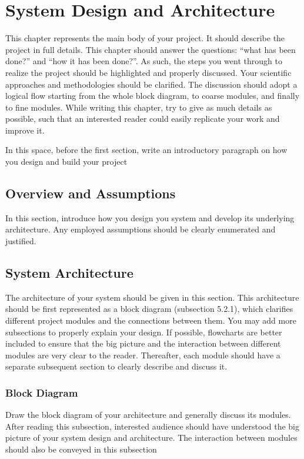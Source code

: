 \chapter{System Design and Architecture}

This chapter represents the main body of your project. It should describe the project in full details. This chapter should answer the questions: “what has been done?” and “how it has been done?”. As such, the steps you went through to realize the project should be highlighted and properly discussed. Your scientific approaches and methodologies should be clarified. The discussion should adopt a logical flow starting from the whole block diagram, to coarse modules, and finally to fine modules. While writing this chapter, try to give as much details as possible, such that an interested reader could easily replicate your work and improve it.

In this space, before the first section, write an introductory paragraph on how you design and build your project

\section{Overview and Assumptions}
In this section, introduce how you design you system and develop its underlying architecture. Any employed assumptions should be clearly enumerated and justified.

\section{System Architecture}
The architecture of your system should be given in this section. This architecture should be first represented as a block diagram (subsection 5.2.1), which clarifies different project modules and the connections between them. You may add more subsections to properly explain your design. If possible, flowcharts are better included to ensure that the big picture and the interaction between different modules are very clear to the reader. Thereafter, each module should have a separate subsequent section to clearly describe and discuss it.

\subsection{Block Diagram}
Draw the block diagram of your architecture and generally discuss its modules. After reading this subsection, interested audience should have understood the big picture of your system design and architecture. The interaction between modules should also be conveyed in this subsection

